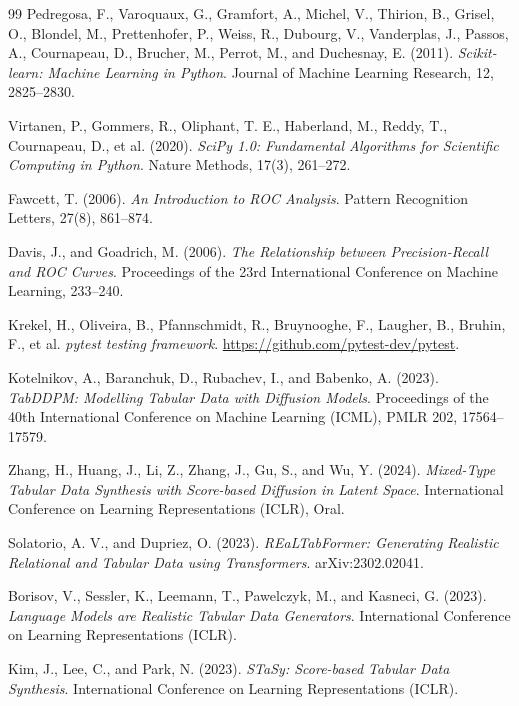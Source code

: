\documentclass[11pt]{informatics-report}
\begin{document}
\begin{thebibliography}{99}
Pedregosa, F., Varoquaux, G., Gramfort, A., Michel, V., Thirion, B., Grisel, O.,
Blondel, M., Prettenhofer, P., Weiss, R., Dubourg, V., Vanderplas, J., Passos, A.,
Cournapeau, D., Brucher, M., Perrot, M., and Duchesnay, E. (2011).
\textit{Scikit-learn: Machine Learning in Python}.
Journal of Machine Learning Research, 12, 2825--2830.

Virtanen, P., Gommers, R., Oliphant, T. E., Haberland, M., Reddy, T., Cournapeau, D., et al. (2020).
\textit{SciPy 1.0: Fundamental Algorithms for Scientific Computing in Python}.
Nature Methods, 17(3), 261--272.

Fawcett, T. (2006).
\textit{An Introduction to ROC Analysis}.
Pattern Recognition Letters, 27(8), 861--874.

Davis, J., and Goadrich, M. (2006).
\textit{The Relationship between Precision-Recall and ROC Curves}.
Proceedings of the 23rd International Conference on Machine Learning, 233--240.

Krekel, H., Oliveira, B., Pfannschmidt, R., Bruynooghe, F., Laugher, B., Bruhin, F., et al.
\textit{pytest testing framework}.
\url{https://github.com/pytest-dev/pytest}.

Kotelnikov, A., Baranchuk, D., Rubachev, I., and Babenko, A. (2023).
\textit{TabDDPM: Modelling Tabular Data with Diffusion Models}.
Proceedings of the 40th International Conference on Machine Learning (ICML), PMLR 202, 17564--17579.

Zhang, H., Huang, J., Li, Z., Zhang, J., Gu, S., and Wu, Y. (2024).
\textit{Mixed-Type Tabular Data Synthesis with Score-based Diffusion in Latent Space}.
International Conference on Learning Representations (ICLR), Oral.

Solatorio, A. V., and Dupriez, O. (2023).
\textit{REaLTabFormer: Generating Realistic Relational and Tabular Data using Transformers}.
arXiv:2302.02041.

Borisov, V., Sessler, K., Leemann, T., Pawelczyk, M., and Kasneci, G. (2023).
\textit{Language Models are Realistic Tabular Data Generators}.
International Conference on Learning Representations (ICLR).

Kim, J., Lee, C., and Park, N. (2023).
\textit{STaSy: Score-based Tabular Data Synthesis}.
International Conference on Learning Representations (ICLR).


\end{thebibliography}
\end{document}
